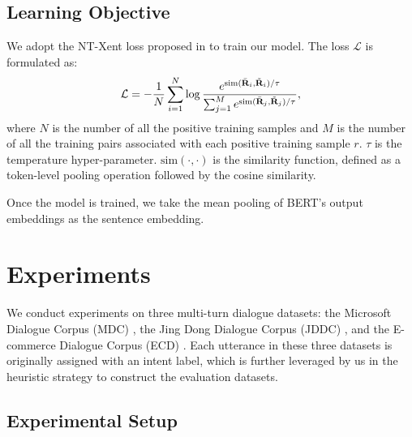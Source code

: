 \documentclass[11pt]{article}
\begin{document}
\subsection{Learning Objective}
We adopt the NT-Xent loss proposed in \cite{oord2018representation} to train our model.
The loss $\mathcal{L}$ is formulated as:
\begin{equation}
    \begin{aligned}
        \mathcal{L} = -\frac{1}{N}\sum_{i=1}^{N} \log\frac{ e^{\text{sim}(\Bar{\textbf{R}}_{i}, \tilde{\textbf{R}}_{i})/\tau} }{\sum_{j=1}^{M}e^{\text{sim}(\Bar{\textbf{R}}_{j}, \tilde{\textbf{R}}_{j})/\tau }},
    \end{aligned}
\end{equation}
where $N$ is the number of all the positive training samples and $M$ is the number of all the training pairs associated with each positive training sample $r$.
$\tau$ is the temperature hyper-parameter.
$\text{sim}(\cdot,\cdot)$ is the similarity function, defined as a token-level pooling operation followed by the cosine similarity.

Once the model is trained, we take the mean pooling of BERT's output embeddings as the sentence embedding.

\section{Experiments}
We conduct experiments on three multi-turn dialogue datasets: the Microsoft Dialogue Corpus (MDC) \cite{mdc}, the Jing Dong Dialogue Corpus (JDDC) \cite{jddc}, and the E-commerce Dialogue Corpus (ECD) \cite{edc}.
Each utterance in these three datasets is originally assigned with an intent label, which is further leveraged by us in the heuristic strategy to construct the evaluation datasets.

\subsection{Experimental Setup}
\end{document}
